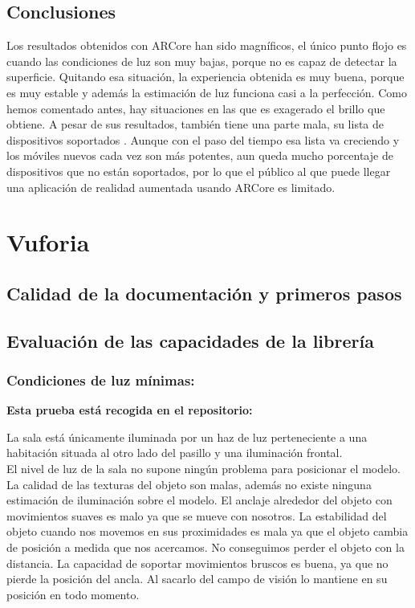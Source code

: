 \subsection{Conclusiones}
Los resultados obtenidos con ARCore han sido magníficos, el único punto flojo es cuando las condiciones de luz son muy bajas, porque no es capaz de detectar la superficie. Quitando esa situación, la experiencia obtenida es muy buena, porque es muy estable y además la estimación de luz funciona casi a la perfección. Como hemos comentado antes, hay situaciones en las que es exagerado el brillo que obtiene. A pesar de sus resultados, también tiene una parte mala, su lista de dispositivos soportados \cite{ARCoreList}. Aunque con el paso del tiempo esa lista va creciendo y los móviles nuevos cada vez son más potentes, aun queda mucho porcentaje de dispositivos que no están soportados, por lo que el público al que puede llegar una aplicación de realidad aumentada usando ARCore es limitado.

\clearpage
\section{Vuforia}
\subsection{Calidad de la documentación y primeros pasos}

\subsection{Evaluación de las capacidades de la librería}
\subsubsection{Condiciones de luz mínimas:}

\textbf{Esta prueba está recogida en el repositorio:}

La sala está únicamente iluminada por un haz de luz perteneciente a una habitación situada al otro lado del pasillo y una iluminación frontal.\\

El nivel de luz de la sala no supone ningún problema para posicionar el modelo. La calidad de las texturas del objeto son malas, además no existe ninguna estimación de iluminación sobre el modelo. El anclaje alrededor del objeto con movimientos suaves es malo ya que se mueve con nosotros. La estabilidad del objeto cuando nos movemos en sus proximidades es mala ya que el objeto cambia de posición a medida que nos acercamos. No conseguimos perder el objeto con la distancia. La capacidad de soportar movimientos bruscos es buena, ya que no pierde la posición del ancla. Al sacarlo del campo de visión lo mantiene en su posición en todo momento.

